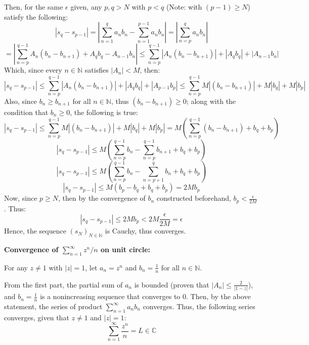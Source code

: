 \documentclass{article}
\begin{document}
Then, for the same $\epsilon$ given, any $p,q> N$ with $p<q$ (Note: with $(p-1)\geq N$) satisfy the following:
$$|s_q-s_{p-1}| = \left|\sum_{n=1}^{q}a_nb_n-\sum_{n=1}^{p-1}a_nb_n\right| = \left|\sum_{n=p}^{q}a_nb_n\right|$$
$$=\left|\sum_{n=p}^{q-1}A_n(b_n-b_{n+1})+A_qb_q-A_{n-1}b_{n}\right| \leq \sum_{n=p}^{q-1}|A_n(b_n-b_{n+1})|+|A_qb_q|+|A_{n-1}b_n|$$
Which, since every $n\in\mathbb{N}$ satisfies $|A_n|<M$, then:
$$|s_q-s_{p-1}| \leq \sum_{n=p}^{q-1}|A_n(b_n-b_{n+1})|+|A_qb_q|+|A_{p-1}b_p| \leq \sum_{n=p}^{q-1}M|(b_n-b_{n+1})|+M|b_q|+M|b_p|$$
Also, since $b_n\geq b_{n+1}$ for all $n\in\mathbb{N}$, thus $(b_n-b_{n+1})\geq 0$; along with the condition that $b_n\geq 0$, the following is true:
$$|s_q-s_{p-1}|\leq \sum_{n=p}^{q-1}M|(b_n-b_{n+1})|+M|b_q|+M|b_p| = M\left(\sum_{n=p}^{q-1}(b_n-b_{n+1})+b_q+b_p\right)$$ 
$$|s_q-s_{p-1}|\leq M\left(\sum_{n=p}^{q-1}b_n - \sum_{n=p}^{q-1}b_{n+1}+b_q+b_p\right)$$
$$|s_q-s_{p-1}|\leq M\left(\sum_{n=p}^{q-1}b_n - \sum_{n=p+1}^{q}b_{n}+b_q+b_p\right)$$
$$|s_q-s_{p-1}|\leq M(b_p-b_q+b_q+b_p) = 2Mb_p$$
Now, since $p\geq N$, then by the convergence of $b_n$ constructed beforehand, $b_p<\frac{\epsilon}{2M}$. Thus:
$$|s_q-s_{p-1}|\leq 2Mb_p < 2M\frac{\epsilon}{2M} = \epsilon$$
Hence, the sequence $(s_N)_{N\in\mathbb{N}}$ is Cauchy, thus converges.

\hfill

\textbf{Convergence of $\sum_{n=1}^{\infty}z^n/n$ on unit circle:}

For any $z\neq 1$ with $|z|=1$, let $a_n=z^n$ and $b_n=\frac{1}{n}$ for all $n\in\mathbb{N}$.

From the first part, the partial sum of $a_n$ is bounded (proven that $|A_n|\leq \frac{2}{|1-z|}$), and $b_n=\frac{1}{n}$ is a nonincreasing sequence
that converges to $0$. Then, by the above statement, the series of product $\sum_{n=1}^{\infty}a_nb_n$ converges. Thus, the following series converges, given that $z\neq 1$ and $|z|=1$:
$$\sum_{n=1}^{\infty}\frac{z^n}{n}=L\in\mathbb{C}$$
\end{document}
